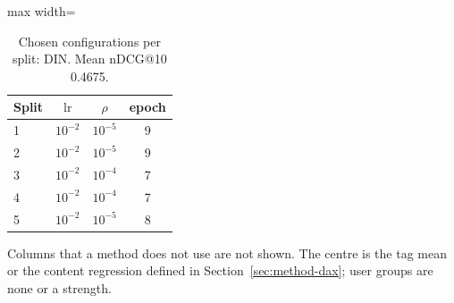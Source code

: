 \begin{table}[tbp]
\centering
\footnotesize
\caption{Chosen configurations per split: DIN. Mean nDCG@10 0.4675.}
\label{tab:grid08}
\begin{adjustbox}{max width=\linewidth}
\begin{tabular}{lccc}
\toprule
Split & $\mathrm{lr}$ & $\rho$ & epoch \\
\midrule
1 & $10^{-2}$ & $10^{-5}$ & 9 \\
2 & $10^{-2}$ & $10^{-5}$ & 9 \\
3 & $10^{-2}$ & $10^{-4}$ & 7 \\
4 & $10^{-2}$ & $10^{-4}$ & 7 \\
5 & $10^{-2}$ & $10^{-5}$ & 8 \\
\bottomrule
\end{tabular}
\end{adjustbox}
\par\smallskip
\begin{minipage}{\linewidth}\raggedright\footnotesize Columns that a method does not use are not shown. The centre is the tag mean or the content regression defined in Section~\ref{sec:method-dax}; user groups are none or a strength.\end{minipage}
\end{table}
